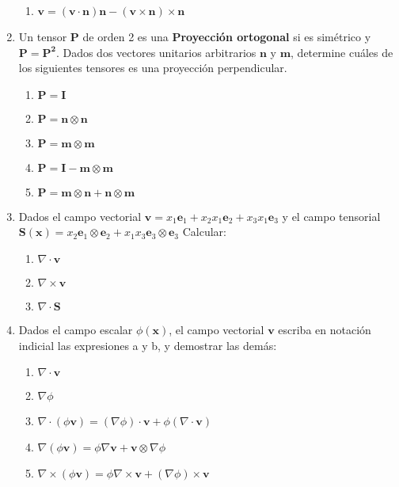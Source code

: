 \documentclass[12pt,a4paper]{article}
\begin{document}
\begin{enumerate}
    \begin{enumerate}
        \item $\mathbf{v}=(\mathbf{v}\cdot\mathbf{n})\mathbf{n}-(\mathbf{v} \times \mathbf{n})\times \mathbf{n}$
    \end{enumerate}
    \item Un tensor $\mathbf{P}$ de orden 2  es una \textbf{Proyección ortogonal} si es simétrico y $\mathbf{P=P^2}$. Dados dos vectores unitarios arbitrarios $\mathbf{n}$ y $\mathbf{m}$, determine cuáles de los siguientes tensores es una proyección perpendicular.
    \begin{enumerate}
        \item $\mathbf{P}=\mathbf{I}$
        \item $\mathbf{P}=\mathbf{n}\otimes\mathbf{n}$
        \item $\mathbf{P}=\mathbf{m}\otimes\mathbf{m}$
        \item $\mathbf{P}=\mathbf{I}-\mathbf{m}\otimes\mathbf{m}$
        \item $\mathbf{P}=\mathbf{m}\otimes\mathbf{n}+\mathbf{n}\otimes\mathbf{m}$
    \end{enumerate}
    \item Dados el campo vectorial 
        $\mathbf{v}=x_1 \mathbf{e}_1+x_2 x_1 \mathbf{e}_2+x_3 x_1 \mathbf{e}_3$ y el campo tensorial
        \\$\mathbf{S} (\mathbf{x})=x_2 \mathbf{e}_1\otimes\mathbf{e}_2+x_1 x_3 \mathbf{e}_3\otimes\mathbf{e}_3$ Calcular:
    \begin{enumerate}
        \item $\nabla\cdot\mathbf{v}$
        \item $\nabla\times\mathbf{v}$
        \item $\nabla\cdot\mathbf{S}$
    \end{enumerate}
    \item Dados el campo escalar $\phi(\mathbf{x})$, el campo vectorial $\mathbf{v}$ escriba en notación indicial las expresiones a y b, y demostrar las demás:
    \begin{enumerate}
        \item $\nabla\cdot\mathbf{v}$
        \item $\nabla\phi$
        \item $\nabla\cdot (\phi\mathbf{v})= (\nabla\phi)\cdot\mathbf{v}+\phi(\nabla\cdot\mathbf{v})$
        \item $\nabla(\phi\mathbf{v}) = \phi\nabla\mathbf{v} + \mathbf{v}\otimes\nabla\phi$
        \item $\nabla\times(\phi\mathbf{v}) =\phi\nabla\times\mathbf{v} + (\nabla\phi)\times\mathbf{v}$
    

\end{enumerate}
\end{enumerate}
\end{document}
